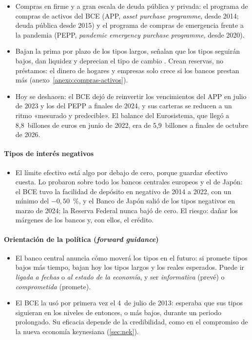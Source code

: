 \documentclass[11pt]{article}
\begin{document}
\begin{itemize}
\item Compras en firme y a gran escala de deuda pública y privada: el programa de compras de activos del BCE (APP, \emph{asset purchase programme}, desde 2014; deuda pública desde 2015) y el programa de compras de emergencia frente a la pandemia (PEPP, \emph{pandemic emergency purchase programme}, desde 2020)\nocite{BCE2026APP,BCE2026PEPP}.
\item Bajan la prima por plazo de los tipos largos, señalan que los tipos seguirán bajos, dan liquidez y deprecian el tipo de cambio . Crean reservas, no préstamos: el dinero de hogares y empresas solo crece si los bancos prestan más (anexo~\ref{anexo:compras-activos}).
\item Hoy se deshacen: el BCE dejó de reinvertir los vencimientos del APP en julio de 2023 y los del PEPP a finales de 2024, y sus carteras se reducen a un ritmo «mesurado y predecible»\nocite{BieberLizarazo2026Liquidez,BCE2026Decisiones}. El balance del Eurosistema, que llegó a 8,8~billones de euros en junio de 2022, era de 5,9~billones a finales de octubre de 2026\nocite{BCE2026ILM}.
\end{itemize}

\paragraph{Tipos de interés negativos}

\begin{itemize}
\item El límite efectivo está algo por debajo de cero, porque guardar efectivo cuesta. Lo probaron sobre todo los bancos centrales europeos y el de Japón: el BCE tuvo la facilidad de depósito en negativo de 2014 a 2022, con un mínimo del $-0{,}50$~\%\nocite{BCE2026TiposOficiales}, y el Banco de Japón salió de los tipos negativos en marzo de 2024\nocite{BoJ2024Marco}; la Reserva Federal nunca bajó de cero. El riesgo: dañar los márgenes de los bancos y, con ellos, el crédito.
\end{itemize}

\paragraph{Orientación de la política (\emph{forward guidance})}

\begin{itemize}
\item El banco central anuncia cómo moverá los tipos en el futuro: si promete tipos bajos más tiempo, bajan hoy los tipos largos y los reales esperados. Puede ir \emph{ligada a fechas} o \emph{al estado de la economía}, y ser \emph{informativa} (prevé) o \emph{comprometida} (promete)\nocite{CampbellEtAl2012Macroeconomic}.
\item El BCE la usó por primera vez el 4~de julio de 2013: esperaba que sus tipos siguieran en los niveles de entonces, o más bajos, durante un periodo prolongado\nocite{BCE2013Orientacion}. Su eficacia depende de la credibilidad, como en el compromiso de la nueva economía keynesiana (\ref{sec:nek}).
\end{itemize}
\end{document}
